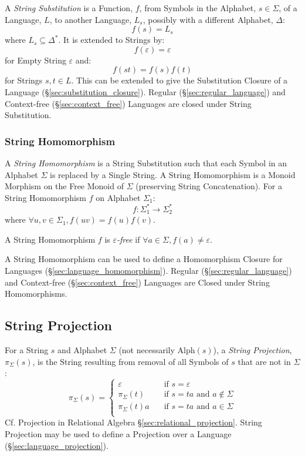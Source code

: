 A \emph{String Substitution} is a Function, $f$, from Symbols in the
Alphabet, $s \in \Sigma$, of a Language, $L$, to another Language,
$L_s$, possibly with a different Alphabet, $\Delta$:
\[
  f(s) = L_s
\]
where $L_s \subseteq \Delta^*$. It is extended to Strings by:
\[
  f(\varepsilon) = \varepsilon
\]
for Empty String $\varepsilon$ and:
\[
  f(st) = f(s)f(t)
\]
for Strings $s,t \in L$. This can be extended to give the Substitution
Closure of a Language (\S\ref{sec:substitution_closure}). Regular
(\S\ref{sec:regular_language}) and Context-free
(\S\ref{sec:context_free}) Languages are closed under String
Substitution.



\subsubsection{String Homomorphism}\label{sec:string_homomorphism}

A \emph{String Homomorphism} is a String Substitution such that each
Symbol in an Alphabet $\Sigma$ is replaced by a Single String. A
String Homomorphism is a Monoid Morphism on the Free Monoid of
$\Sigma$ (preserving String Concatenation). For a String Homomorphism
$f$ on Alphabet $\Sigma_1$:
\[
  f : \Sigma_1^* \rightarrow \Sigma_2^*
\]
where $\forall u,v \in \Sigma_1, f(uv) = f(u)f(v)$.

A String Homomorphism $f$ is \emph{$\varepsilon$-free} if $\forall a
\in \Sigma, f(a) \neq \varepsilon$.

A String Homomorphism can be used to define a Homomorphism Closure for
Languages (\S\ref{sec:language_homomorphism}). Regular
(\S\ref{sec:regular_language}) and Context-free
(\S\ref{sec:context_free}) Languages are Closed under String
Homomorphisms.



\subsection{String Projection}\label{sec:string_projection}

For a String $s$ and Alphabet $\Sigma$ (not necessarily
$\text{Alph}(s)$), a \emph{String Projection}, $\pi_{\Sigma}(s)$, is
the String resulting from removal of all Symbols of $s$ that are not
in $\Sigma$:
\[
  \pi_{\Sigma}(s) =
  \begin{cases}
    \varepsilon       & \quad \text{if $s = \varepsilon$}\\
    \pi_{\Sigma}(t)   & \quad \text{if $s = ta$ and $a \notin \Sigma$}\\
    \pi_{\Sigma}(t)a  & \quad \text{if $s = ta$ and $a \in \Sigma$}\\
  \end{cases}
\]
\HandRight\; Cf. Projection in Relational Algebra
\S\ref{sec:relational_projection}. String Projection may be used to
define a Projection over a Language (\S\ref{sec:language_projection}).



